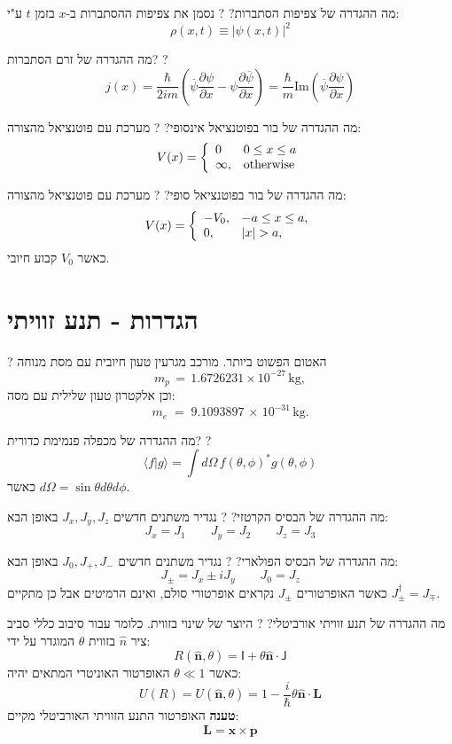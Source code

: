 \documentclass{tstextbook}
\begin{document}
מה ההגדרה של צפיפות הסתברות?
?
נסמן את צפיפות ההסתברות ב-\(x\) בזמן \(t\) ע"י:
$$\rho\left(x,t\right)\equiv\left|\psi\left(x,t\right)\right|^{2}$$

מה ההגדרה של זרם הסתברות?
?
$$j\left(x\right)=\frac\hbar{2i m}\left(\overline{{{\psi}}}\frac{\partial\psi}{\partial x}-\psi\frac{\partial\overline{{{\psi}}}}{\partial x}\right)=\frac\hbar m\mathrm{Im}\left(\overline{{{\psi}}}\frac{\partial\psi}{\partial x}\right)$$

מה ההגדרה של בור בפוטנציאל אינסופי?
?
מערכת עם פוטנציאל מהצורה:
$$V(x)=\left\{{\begin{array}{l l}{{0}}&{{{0\leq x\leq a}}}\\ {{\infty,}}&{{\mathrm{otherwise}}}\end{array}}\right.$$

מה ההגדרה של בור בפוטנציאל סופי?
?
מערכת עם פוטנציאל מהצורה:
$$V(x)=\left\{\begin{array}{l l}{{-V_{0},}}&{{-a\le x\le a,}}\\ {{0,}}&{{\vert x\vert>a,}}\end{array}\right.$$
כאשר \(V_{0}\) קבוע חיובי.

\section{הגדרות - תנע זוויתי}

?
האטום הפשוט ביותר. מורכב מגרעין טעון חיובית עם מסת מנוחה
$$m_{p}\,=\,1.6726231\times10^{-27}\,\mathrm{kg},$$
וכן אלקטרון טעון שלילית עם מסה:
$$m_{e}\;=\;9.1093897\,\times\,10^{-31}\,\mathrm{kg}.$$

מה ההגדרה של מכפלה פנמימת כדורית?
?
$$\langle f|g\rangle=\int d\Omega\,f(\theta,\phi)^{*}g(\theta,\phi)$$
כאשר \(d\Omega=\sin \theta d\theta d\phi\).

מה ההגדרה של הבסיס הקרטזי?
?
נגדיר משתנים חדשים \(J_{x},J_{y},J_{z}\) באופן הבא:
$$J_{x}=J_{1} \qquad J_{y}=J_{2} \qquad  J_{z}=J_{3}$$

מה ההגדרה של הבסיס הפולארי?
?
נגדיר משתנים חדשים \(J_{0},J_{+},J_{-}\) באופן הבא:
$$J_{\pm}=J_{x}\pm i J_{y}\qquad J_{0}=J_{z}$$
כאשר האופרטורים \(J_{\pm}\) נקראים אופרטורי סולם, ואינם הרמיטים אבל כן מתקיים \(J_{\pm}^{\dagger}=J_{\mp}\).

מה ההגדרה של תנע זוויתי אורביטלי?
?
היוצר של שינוי בזווית. כלומר עבור סיבוב כללי סביב ציר \(\hat{n}\) בזווית \(\theta\) המוגדר על ידי:
$$R(\mathbf{\hat{n}},\theta)=\mathsf{I}+\theta\mathbf{\hat{n}}\cdot\mathsf{J}$$
כאשר \(\theta\ll 1\) האופרטור האוניטרי המתאים יהיה:
$$U(R)=U(\mathbf{\hat{n}},\theta)=1-{\frac{i}{\hbar}}\theta\mathbf{\hat{n}}\cdot\mathbf{L}$$\textbf{טענה}
האופרטור התנע הזוויתי האורביטלי מקיים:
$$\mathbf{L}=\mathbf{x}\times\mathbf{p}$$
\end{document}
